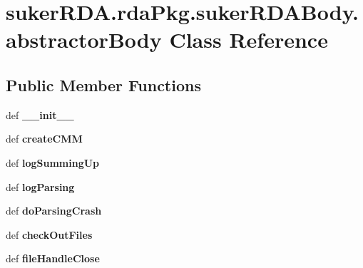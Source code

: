\hypertarget{classsuker_r_d_a_1_1rda_pkg_1_1suker_r_d_a_body_1_1abstractor_body}{\section{suker\+R\+D\+A.\+rda\+Pkg.\+suker\+R\+D\+A\+Body.\+abstractor\+Body Class Reference}
\label{classsuker_r_d_a_1_1rda_pkg_1_1suker_r_d_a_body_1_1abstractor_body}
}
\subsection*{Public Member Functions}
\begin{DoxyCompactItemize}
\item 
\hypertarget{classsuker_r_d_a_1_1rda_pkg_1_1suker_r_d_a_body_1_1abstractor_body_ac1b0f6563aa0f47587e4b097d94e9e71}{def {\bfseries \+\_\+\+\_\+init\+\_\+\+\_\+}}\label{classsuker_r_d_a_1_1rda_pkg_1_1suker_r_d_a_body_1_1abstractor_body_ac1b0f6563aa0f47587e4b097d94e9e71}

\item 
\hypertarget{classsuker_r_d_a_1_1rda_pkg_1_1suker_r_d_a_body_1_1abstractor_body_a3f45860c18e8720e4f402bbdab105465}{def {\bfseries create\+C\+M\+M}}\label{classsuker_r_d_a_1_1rda_pkg_1_1suker_r_d_a_body_1_1abstractor_body_a3f45860c18e8720e4f402bbdab105465}

\item 
\hypertarget{classsuker_r_d_a_1_1rda_pkg_1_1suker_r_d_a_body_1_1abstractor_body_adcb7abe75074d452fc94cff22479e621}{def {\bfseries log\+Summing\+Up}}\label{classsuker_r_d_a_1_1rda_pkg_1_1suker_r_d_a_body_1_1abstractor_body_adcb7abe75074d452fc94cff22479e621}

\item 
\hypertarget{classsuker_r_d_a_1_1rda_pkg_1_1suker_r_d_a_body_1_1abstractor_body_a0882848f942e5711ff30b71220149a24}{def {\bfseries log\+Parsing}}\label{classsuker_r_d_a_1_1rda_pkg_1_1suker_r_d_a_body_1_1abstractor_body_a0882848f942e5711ff30b71220149a24}

\item 
\hypertarget{classsuker_r_d_a_1_1rda_pkg_1_1suker_r_d_a_body_1_1abstractor_body_afe6f6ec2dc185d143cc408102fe8cb96}{def {\bfseries do\+Parsing\+Crash}}\label{classsuker_r_d_a_1_1rda_pkg_1_1suker_r_d_a_body_1_1abstractor_body_afe6f6ec2dc185d143cc408102fe8cb96}

\item 
\hypertarget{classsuker_r_d_a_1_1rda_pkg_1_1suker_r_d_a_body_1_1abstractor_body_aa899d1e3b68452eb7c91cf646183591d}{def {\bfseries check\+Out\+Files}}\label{classsuker_r_d_a_1_1rda_pkg_1_1suker_r_d_a_body_1_1abstractor_body_aa899d1e3b68452eb7c91cf646183591d}

\item 
\hypertarget{classsuker_r_d_a_1_1rda_pkg_1_1suker_r_d_a_body_1_1abstractor_body_a6f03abfa9a3ea608a3b5e2700891828d}{def {\bfseries file\+Handle\+Close}}\label{classsuker_r_d_a_1_1rda_pkg_1_1suker_r_d_a_body_1_1abstractor_body_a6f03abfa9a3ea608a3b5e2700891828d}

\end{DoxyCompactItemize}
